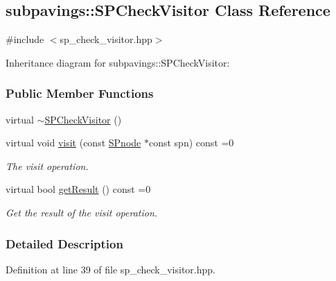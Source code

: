 \hypertarget{classsubpavings_1_1SPCheckVisitor}{\subsection{subpavings\-:\-:\-S\-P\-Check\-Visitor \-Class \-Reference}
\label{classsubpavings_1_1SPCheckVisitor}
}


{\ttfamily \#include $<$sp\-\_\-check\-\_\-visitor.\-hpp$>$}



\-Inheritance diagram for subpavings\-:\-:\-S\-P\-Check\-Visitor\-:
\subsubsection*{\-Public \-Member \-Functions}
\begin{DoxyCompactItemize}
\item 
virtual \hyperlink{classsubpavings_1_1SPCheckVisitor_a041470491ae2202032abc1f23293d5d0}{$\sim$\-S\-P\-Check\-Visitor} ()
\item 
virtual void \hyperlink{classsubpavings_1_1SPCheckVisitor_ad5fd0bde6d256676290e790c6387f01a}{visit} (const \hyperlink{classsubpavings_1_1SPnode}{\-S\-Pnode} $\ast$const spn) const =0
\begin{DoxyCompactList}\small\item\em \-The visit operation. \end{DoxyCompactList}\item 
virtual bool \hyperlink{classsubpavings_1_1SPCheckVisitor_a6ea58710e956211e24fe4997eed3d94f}{get\-Result} () const =0
\begin{DoxyCompactList}\small\item\em \-Get the result of the visit operation. \end{DoxyCompactList}\end{DoxyCompactItemize}


\subsubsection{\-Detailed \-Description}


\-Definition at line 39 of file sp\-\_\-check\-\_\-visitor.\-hpp.



